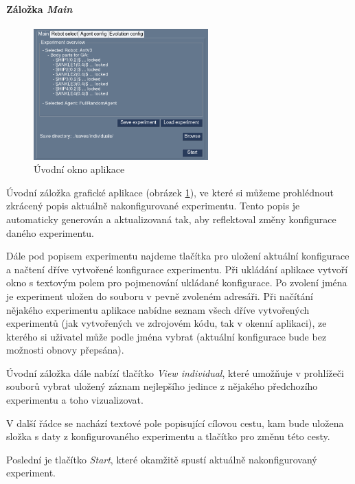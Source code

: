 \paragraph{Záložka \emph{Main}}
\begin{figure}[!htb]
    \centering
    \includegraphics[width=0.6\textwidth]{../img/GUI_main_tab.jpg}
    \caption{Úvodní okno aplikace}
    \label{doc_12_fig:GUI_main}
\end{figure}
Úvodní záložka grafické aplikace (obrázek \ref{doc_12_fig:GUI_main}), ve které
si můžeme prohlédnout zkrácený popis aktuálně nakonfigurované experimentu.
Tento popis je automaticky generován a aktualizovaná tak, aby reflektoval změny
konfigurace daného experimentu. 

Dále pod popisem experimentu najdeme tlačítka pro uložení aktuální konfigurace
a načtení dříve vytvořené konfigurace experimentu. Při ukládání aplikace
vytvoří okno s textovým polem pro pojmenování ukládané konfigurace. Po zvolení
jména je experiment uložen do souboru v pevně zvoleném adresáři. Při načítání
nějakého experimentu aplikace nabídne seznam všech dříve vytvořených
experimentů (jak vytvořených ve zdrojovém kódu, tak v okenní aplikaci), ze
kterého si uživatel může podle jména vybrat (aktuální konfigurace bude bez
možnosti obnovy přepsána).

Úvodní záložka dále nabízí tlačítko \emph{View individual}, které umožňuje v
prohlížeči souborů vybrat uložený záznam nejlepšího jedince z nějakého
předchozího experimentu a toho vizualizovat.

V další řádce se nachází textové pole popisující cílovou cestu, kam bude
uložena složka s daty z konfigurovaného experimentu a tlačítko pro změnu této
cesty.

Poslední je tlačítko \emph{Start}, které okamžitě spustí aktuálně
nakonfigurovaný experiment.

